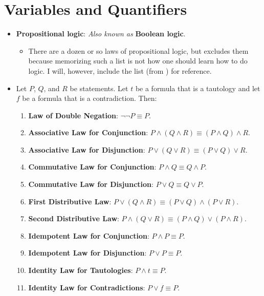 \documentclass[../main.tex]{subfiles}
\begin{document}
\section{Variables and Quantifiers}\label{sss:A.4}
\begin{itemize}
    \item \textbf{Propositional logic}:  \emph{Also known as} \textbf{Boolean logic}.
    \begin{itemize}
        \item There are a dozen or so laws of propositional logic, but \cite{bib:AnalysisI} excludes them because memorizing such a list is not how one should learn how to do logic. I will, however, include the list (from \cite{bib:PropositionalLogicLaws}) for reference.
    \end{itemize}
    \item Let $P$, $Q$, and $R$ be statements. Let $t$ be a formula that is a tautology and let $f$ be a formula that is a contradiction. Then:
    \begin{enumerate}
        \item \textbf{Law of Double Negation}: $\neg\neg P\equiv P$.
        \item \textbf{Associative Law for Conjunction}: $P\wedge(Q\wedge R)\equiv(P\wedge Q)\wedge R$.
        \item \textbf{Associative Law for Disjunction}: $P\vee(Q\vee R)\equiv (P\vee Q)\vee R$.
        \item \textbf{Commutative Law for Conjunction}: $P\wedge Q\equiv Q\wedge P$.
        \item \textbf{Commutative Law for Disjunction}: $P\vee Q\equiv Q\vee P$.
        \item \textbf{First Distributive Law}: $P\vee(Q\wedge R)\equiv(P\vee Q)\wedge(P\vee R)$.
        \item \textbf{Second Distributive Law}: $P\wedge(Q\vee R)\equiv(P\wedge Q)\vee(P\wedge R)$.
        \item \textbf{Idempotent Law for Conjunction}: $P\wedge P\equiv P$.
        \item \textbf{Idempotent Law for Disjunction}: $P\vee P\equiv P$.
        \item \textbf{Identity Law for Tautologies}: $P\wedge t\equiv P$.
        \item \textbf{Identity Law for Contradictions}: $P\vee f\equiv P$.

\end{enumerate}
\end{itemize}
\end{document}
